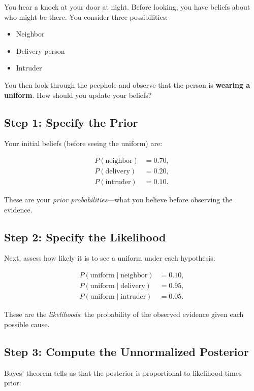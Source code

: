 \documentclass[11pt]{article}
\begin{document}
You hear a knock at your door at night. Before looking, you have beliefs about who might be there. You consider three possibilities:

\begin{itemize}
\item Neighbor
    \item Delivery person
    \item Intruder
\end{itemize}

You then look through the peephole and observe that the person is \textbf{wearing a uniform}. How should you update your beliefs?

\subsection*{Step 1: Specify the Prior}

Your initial beliefs (before seeing the uniform) are:

\begin{align*}
P(\text{neighbor}) &= 0.70, \\
P(\text{delivery}) &= 0.20, \\
P(\text{intruder}) &= 0.10.
\end{align*}

These are your \emph{prior probabilities}—what you believe before observing the evidence.

\subsection*{Step 2: Specify the Likelihood}

Next, assess how likely it is to see a uniform under each hypothesis:

\begin{align*}
P(\text{uniform} \mid \text{neighbor}) &= 0.10, \\
P(\text{uniform} \mid \text{delivery}) &= 0.95, \\
P(\text{uniform} \mid \text{intruder}) &= 0.05.
\end{align*}

These are the \emph{likelihoods}: the probability of the observed evidence given each possible cause.

\subsection*{Step 3: Compute the Unnormalized Posterior}

Bayes' theorem tells us that the posterior is proportional to likelihood times prior:
\end{document}
